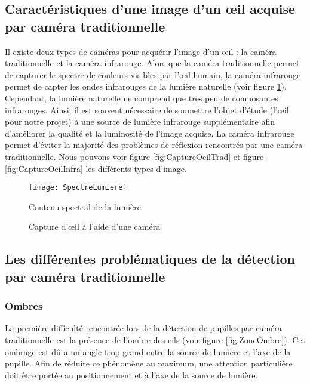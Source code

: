 \subsection{Caractéristiques d’une image d’un œil acquise par caméra traditionnelle}

Il existe deux types de caméras pour acquérir l'image d’un œil : la caméra traditionnelle et la caméra infrarouge. Alors que la caméra traditionnelle permet de capturer le spectre de couleurs visibles par l’œil humain, la caméra infrarouge permet de capter les ondes infrarouges de la lumière naturelle (voir figure \ref{fig:SpectreLumiere}). Cependant, la lumière naturelle ne comprend que très peu de composantes infrarouges. Ainsi, il est souvent nécessaire de soumettre l’objet d’étude (l’œil pour notre projet) à une source de lumière infrarouge supplémentaire afin d’améliorer la qualité et la luminosité de l’image acquise. La caméra infrarouge permet d’éviter la majorité des problèmes de réflexion rencontrés par une caméra traditionnelle. Nous pouvons voir figure \ref{fig:CaptureOeilTrad} et figure \ref{fig:CaptureOeilInfra} les différents types d’image.

\begin{figure}[h]
  \centering
  \texttt{[image: SpectreLumiere]}
  \caption{Contenu spectral de la lumière}
  \label{fig:SpectreLumiere}
\end{figure}

\begin{figure}[!h] 
\centering
{}
\quad 
{}
\caption{Capture d’œil à l’aide d’une caméra} 
\end{figure}

\subsection{Les différentes problématiques de la détection par caméra traditionnelle}

\subsubsection{Ombres}

La première difficulté rencontrée lors de la détection de pupilles par caméra traditionnelle est la présence de l'ombre des cils (voir figure \ref{fig:ZoneOmbre}). Cet ombrage est dû à un angle trop grand entre la source de lumière et l’axe de la pupille. Afin de réduire ce phénomène au maximum, une attention particulière doit être portée au positionnement et à l’axe de la source de lumière.

